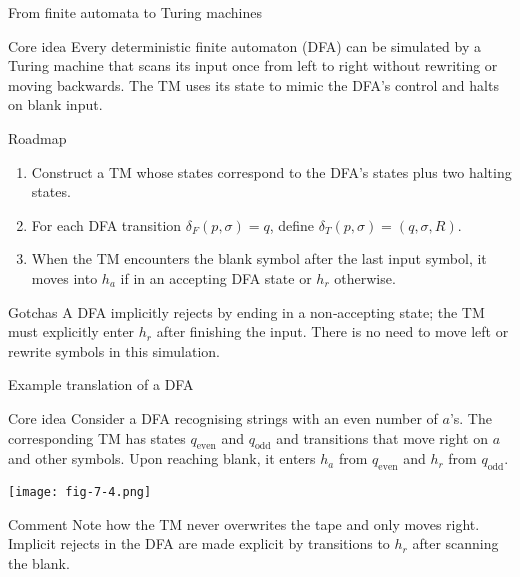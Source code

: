 \begin{frame}[t]{From finite automata to Turing machines}
  \begin{tblock}{Core idea}
    Every deterministic finite automaton (DFA) can be simulated by a
    Turing machine that scans its input once from left to right
    without rewriting or moving backwards.  The TM uses its state to
    mimic the DFA’s control and halts on blank input.
  \end{tblock}
  \begin{tblock}{Roadmap}
    \begin{enumerate}
      \item Construct a TM whose states correspond to the DFA’s
        states plus two halting states.
      \item For each DFA transition $\delta_F(p,\sigma)=q$, define
        $\delta_T(p,\sigma)=(q,\sigma,R)$.
      \item When the TM encounters the blank symbol after the last
        input symbol, it moves into $h_a$ if in an accepting DFA state
        or $h_r$ otherwise.
    \end{enumerate}
  \end{tblock}
  \begin{talert}{Gotchas}
    A DFA implicitly rejects by ending in a non‑accepting state; the TM
    must explicitly enter $h_r$ after finishing the input.  There is no
    need to move left or rewrite symbols in this simulation.
  \end{talert}
  \label{fr:7.2-03}
\end{frame}

\begin{frame}[t]{Example translation of a DFA}
  \begin{tblock}{Core idea}
    Consider a DFA recognising strings with an even number of $a$’s.
    The corresponding TM has states $q_{\mathrm{even}}$ and
    $q_{\mathrm{odd}}$ and transitions that move right on $a$ and
    other symbols.  Upon reaching blank, it enters $h_a$ from
    $q_{\mathrm{even}}$ and $h_r$ from $q_{\mathrm{odd}}$.
  \end{tblock}
  \centering
  \texttt{[image: fig-7-4.png]} %
  \begin{talert}{Comment}
    Note how the TM never overwrites the tape and only moves right.
    Implicit rejects in the DFA are made explicit by transitions to
    $h_r$ after scanning the blank.
  \end{talert}
  \label{fr:7.2-04}
\end{frame}

